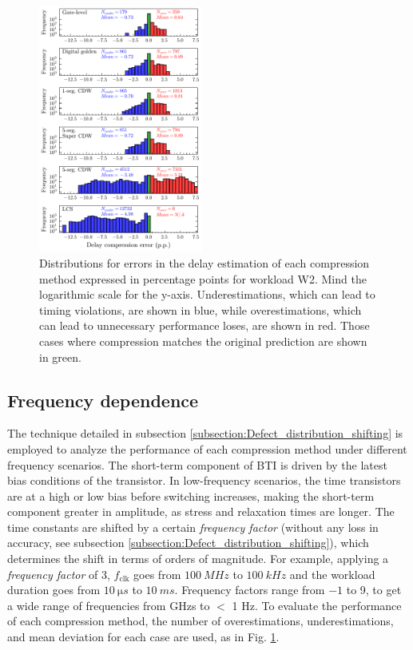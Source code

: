 \begin{figure}[!t]
    \includegraphics[width=0.48\textwidth,trim={0 0 0 0},clip]{images/ch2/error_delay_report_plot.pdf}
    \caption{Distributions for errors in the delay estimation of each compression method expressed in percentage points for workload W2. Mind the logarithmic scale for the y-axis. Underestimations, which can lead to timing violations, are shown in blue, while overestimations, which can lead to unnecessary performance loses, are shown in red. Those cases where compression matches the original prediction are shown in green.}
    \label{fig:delay_compression_error}
\end{figure}

\subsection{Frequency dependence}
\label{subsection:freq_dependence}
The technique detailed in subsection \ref{subsection:Defect_distribution_shifting} is employed to analyze the performance of each compression method under different frequency scenarios. The short-term component of \gls{BTI} is driven by the latest bias conditions of the transistor. In low-frequency scenarios, the time transistors are at a high or low bias before switching increases, making the short-term component greater in amplitude, as stress and relaxation times are longer. The time constants are shifted by a certain \textit{frequency factor} (without any loss in accuracy, see subsection \ref{subsection:Defect_distribution_shifting}), which determines the shift in terms of orders of magnitude. For example, applying a \textit{frequency factor} of 3, $f_\text{clk}$ goes from $\qty{100}{MHz}$ to $\qty{100}{kHz}$ and the workload duration goes from $\qty{10}{\micro s}$ to $\qty{10}{ms}$. Frequency factors range from $-1$ to 9, to get a wide range of frequencies from GHzs to $<$ 1 Hz. To evaluate the performance of each compression method, the number of overestimations, underestimations, and mean deviation for each case are used, as in Fig. \ref{fig:delay_compression_error}. 

